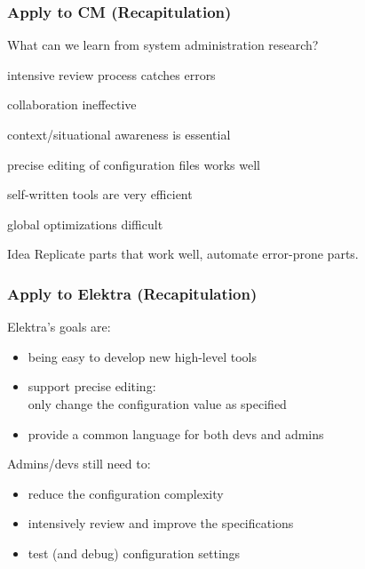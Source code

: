 \begin{frame}
	\frametitle{Apply to CM (Recapitulation)}

	What can we learn from system administration research?

	\begin{description}[<+-| alert@+>]
	\item[$+$] intensive review process catches errors
	\item[$-$] collaboration ineffective
	\item[$-$] context/situational awareness is essential
	\item[$+$] precise editing of configuration files works well
	\item[$+$] self-written tools are very efficient
	\item[$-$] global optimizations difficult
	\end{description}

	\pause[\thebeamerpauses]  %

	\begin{alertblock}{Idea}
	Replicate parts that work well, automate error-prone parts.
	\end{alertblock}
\end{frame}

\begin{frame}
	\frametitle{Apply to Elektra (Recapitulation)}

	Elektra's goals are:

	\begin{itemize}[<+-| alert@+>]
	\item being easy to develop new high-level tools
	\item support precise editing:\\ only change the configuration value as specified
	\item provide a common language for both devs and admins
	\end{itemize}

	\pause[\thebeamerpauses]  %

	Admins/devs still need to:

	\begin{itemize}[<+-| alert@+>]
	\item reduce the configuration complexity
	\item intensively review and improve the specifications
	\item test (and debug) configuration settings
	\end{itemize}
\end{frame}

